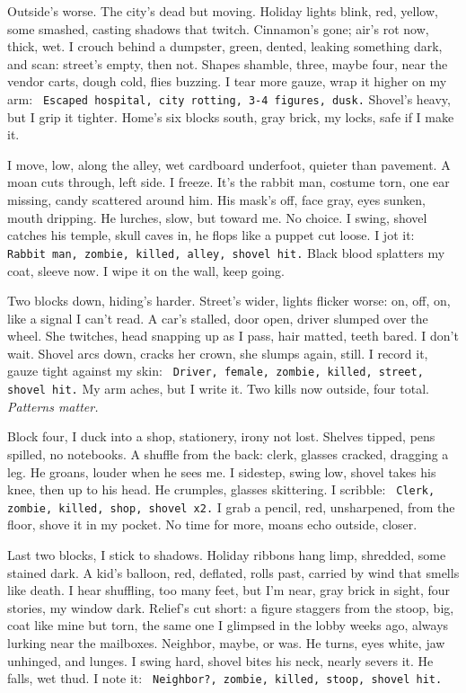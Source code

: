 \documentclass[12pt]{article} %
\newcommand{\note}[1]{\texttt{\small \color{DarkGray} #1}}
\begin{document}
Outside’s worse. The city’s dead but moving. Holiday lights blink, red, yellow, some smashed, casting shadows that twitch. Cinnamon’s gone; air’s rot now, thick, wet. I crouch behind a dumpster, green, dented, leaking something dark, and scan: street’s empty, then not. Shapes shamble, three, maybe four, near the vendor carts, dough cold, flies buzzing. I tear more gauze, wrap it higher on my arm: \note{Escaped hospital, city rotting, 3-4 figures, dusk.} Shovel’s heavy, but I grip it tighter. Home’s six blocks south, gray brick, my locks, safe if I make it.

I move, low, along the alley, wet cardboard underfoot, quieter than pavement. A moan cuts through, left side. I freeze. It’s the rabbit man, costume torn, one ear missing, candy scattered around him. His mask’s off, face gray, eyes sunken, mouth dripping. He lurches, slow, but toward me. No choice. I swing, shovel catches his temple, skull caves in, he flops like a puppet cut loose. I jot it: \note{Rabbit man, zombie, killed, alley, shovel hit.} Black blood splatters my coat, sleeve now. I wipe it on the wall, keep going.

Two blocks down, hiding’s harder. Street’s wider, lights flicker worse: on, off, on, like a signal I can’t read. A car’s stalled, door open, driver slumped over the wheel. She twitches, head snapping up as I pass, hair matted, teeth bared. I don’t wait. Shovel arcs down, cracks her crown, she slumps again, still. I record it, gauze tight against my skin: \note{Driver, female, zombie, killed, street, shovel hit.} My arm aches, but I write it. Two kills now outside, four total. \textit{Patterns matter.}

Block four, I duck into a shop, stationery, irony not lost. Shelves tipped, pens spilled, no notebooks. A shuffle from the back: clerk, glasses cracked, dragging a leg. He groans, louder when he sees me. I sidestep, swing low, shovel takes his knee, then up to his head. He crumples, glasses skittering. I scribble: \note{Clerk, zombie, killed, shop, shovel x2.} I grab a pencil, red, unsharpened, from the floor, shove it in my pocket. No time for more, moans echo outside, closer.

Last two blocks, I stick to shadows. Holiday ribbons hang limp, shredded, some stained dark. A kid’s balloon, red, deflated, rolls past, carried by wind that smells like death. I hear shuffling, too many feet, but I’m near, gray brick in sight, four stories, my window dark. Relief’s cut short: a figure staggers from the stoop, big, coat like mine but torn, the same one I glimpsed in the lobby weeks ago, always lurking near the mailboxes. Neighbor, maybe, or was. He turns, eyes white, jaw unhinged, and lunges. I swing hard, shovel bites his neck, nearly severs it. He falls, wet thud. I note it: \note{Neighbor?, zombie, killed, stoop, shovel hit.}
\end{document}
